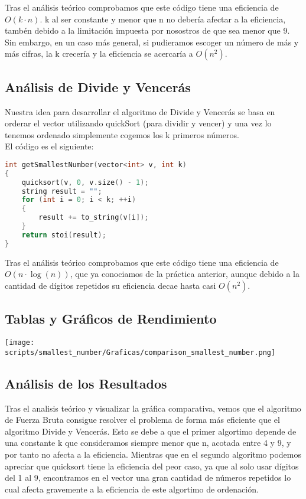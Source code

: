 \documentclass[a4paper,12pt]{article}
\begin{document}
	 Tras el análisis teórico comprobamos que este código tiene una eficiencia de $O(k\cdot n)$. 
	 k al ser constante y menor que n no debería afectar a la eficiencia, tambén debido a la limitación 
	 impuesta por nosostros de que sea menor que 9. Sin embargo, en un caso más general, si pudieramos escoger un número de más y
	 más cifras, la k crecería y la eficiencia se acercaría a $O(n^2)$.\\
	 
\subsection{Análisis de Divide y Vencerás}
Nuestra idea para desarrollar el algoritmo de Divide y Vencerás se basa en orderar el vector utilizando quickSort 
(para dividir y vencer) y una vez lo tenemos ordenado simplemente cogemos los k primeros números. \\

El código es el siguiente:

\begin{lstlisting}[language=C++, caption={Divide y vencerás de \textbf{``El número más pequeño''}}]
int getSmallestNumber(vector<int> v, int k)
{
	quicksort(v, 0, v.size() - 1);
	string result = "";
	for (int i = 0; i < k; ++i)
	{
		result += to_string(v[i]);
	}
	return stoi(result);
}	
	 \end{lstlisting}

Tras el análisis teórico comprobamos que este código tiene una eficiencia de $O(n\cdot \log (n))$, 
que ya conociamos de la práctica anterior, aunque debido a la cantidad de dígitos repetidos su eficiencia decae hasta casi $O(n^2)$.\\

\subsection{Tablas y Gráficos de Rendimiento}

\begin{center}
	\texttt{[image: scripts/smallest\_number/Graficas/comparison\_smallest\_number.png]}	
\end{center}

\subsection{Análisis de los Resultados}
Tras el analisis teórico y visualizar la gráfica comparativa, vemos que el algoritmo de Fuerza 
Bruta consigue resolver el problema de forma más eficiente que el algoritmo Divide y Vencerás. 
Esto se debe a que el primer algortimo depende de una constante k que consideramos siempre menor 
que n, acotada entre 4 y 9, y por tanto no afecta a la eficiencia. Mientras que en el segundo algoritmo podemos apreciar 
que quicksort tiene la eficiencia del peor caso, ya que al solo usar dígitos del 1 al 9, encontramos
en el vector una gran cantidad de números repetidos lo cual afecta gravemente a la eficiencia de este 
algortimo de ordenación.
\end{document}
